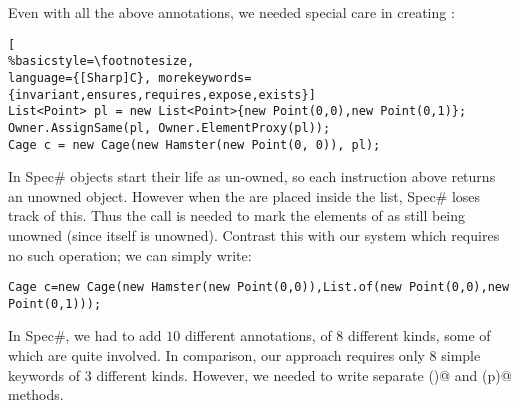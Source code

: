 
Even with all the above annotations, we needed special care in creating \Q@Cage@s:%
\begin{lstlisting}[
%basicstyle=\footnotesize,
language={[Sharp]C}, morekeywords={invariant,ensures,requires,expose,exists}]
List<Point> pl = new List<Point>{new Point(0,0),new Point(0,1)};
Owner.AssignSame(pl, Owner.ElementProxy(pl));
Cage c = new Cage(new Hamster(new Point(0, 0)), pl);
\end{lstlisting}

\noindent In Spec\# objects start their life as un-owned, so each \Q@new@ instruction above returns an unowned object. However when the \Q@Point@s are placed inside the \Q@pl@ list, Spec\# loses track of this. Thus the \Q@AssignSame@ call is needed to mark the elements of \Q@pl@ as still being unowned (since \Q@pl@ itself is unowned).
Contrast this with our system which requires no such operation; we can simply write:
\begin{lstlisting}
Cage c=new Cage(new Hamster(new Point(0,0)),List.of(new Point(0,0),new Point(0,1)));
\end{lstlisting}

In Spec\#, we had to add $10$ different annotations, of $8$ different kinds, some of which are quite involved.
In comparison, our approach requires only $8$ simple keywords of $3$ different kinds. However, we needed to write 
separate \Q@pos()@ and \Q@moveTo(p)@ methods.

